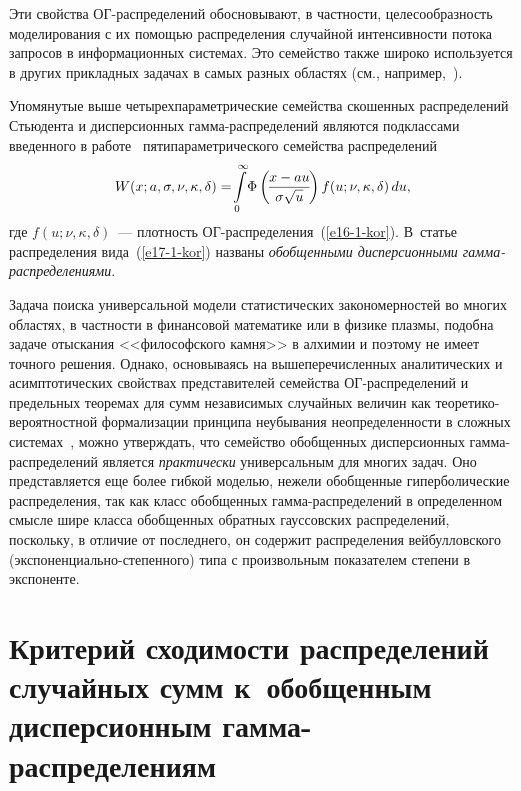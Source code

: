 \begin{multicols}{2}
Эти свойства ОГ-распре\-де\-ле\-ний обосновывают, в частности,
целесообразность моделирования с их помощью распределения случайной
интенсивности потока запросов в информационных системах. Это
семейство также широко используется в других прикладных задачах в
самых разных областях (см., например,~\cite{KorolevShorgin2011}).

Упомянутые выше четырехпараметрические семейства скошенных
распределений Стьюдента и дисперсионных гам\-ма-рас\-пре\-де\-ле\-ний являются
подклассами введенного в работе~\cite{KorolevSokolov2012}
пятипа\-ра\-мет\-ри\-че\-ско\-го семейства распределений
\begin{equation}
W(x;a,\sigma,\nu,\kappa,\delta)=\!\int\limits_{0}^{\infty}
\!\Phi\left(\!\displaystyle\frac{\displaystyle x-au\mathstrut}{\displaystyle \sigma\sqrt{u}\mathstrut}\!\right)
f(u;\nu,\kappa,\delta)\,du,\!\!
\label{e17-1-kor}
\end{equation}
где $f(u;\nu,\kappa,\delta)$~--- плотность ОГ-рас\-пре\-де\-ле\-ния~(\ref{e16-1-kor}). 
В~статье \cite{KorolevSokolov2012} распределения вида~(\ref{e17-1-kor}) названы
{\it обобщенными дисперсионными гамма-распределениями}.

Задача поиска универсальной модели статистических закономерностей во
многих областях, в частности в финансовой математике или в физике
плазмы, подобна задаче отыскания <<философского камня>> в алхимии и
поэтому не имеет точного решения. Однако, основываясь на
вышеперечисленных аналитических и асимптотических свойствах
представителей семейства ОГ-рас\-пре\-де\-ле\-ний и предельных теоремах для
сумм независимых случайных величин как тео\-ре\-ти\-ко-ве\-ро\-ят\-но\-ст\-ной
формализации принципа неубывания неопределенности в сложных системах~\cite{GnedenkoKorolev1996}, 
можно утверждать, что семейство
обобщенных дисперсионных гам\-ма-рас\-пре\-де\-ле\-ний является {\it
практически} универсальным для многих задач. Оно представляется еще
более гибкой моделью, нежели обобщенные гиперболические
распределения, так как класс обобщенных гам\-ма-рас\-пре\-де\-ле\-ний в
определенном смысле шире класса обобщенных обратных гауссовских
распределений, поскольку, в отличие от последнего, он содержит
распределения вейбулловского (экс\-по\-нен\-ци\-аль\-но-сте\-пен\-но\-го) типа с
произвольным показателем степени в экспоненте.

\section{Критерий сходимости распределений случайных сумм к~обобщенным
дисперсионным гамма-распределениям}


\end{multicols}
